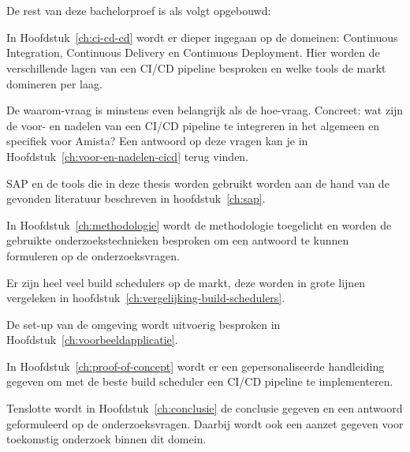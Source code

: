 \section{}
\label{sec:opzet-bachelorproef}


De rest van deze bachelorproef is als volgt opgebouwd:

In Hoofdstuk~\ref{ch:ci-cd-cd} wordt er dieper ingegaan op de domeinen: Continuous Integration, Continuous Delivery en Continuous Deployment. Hier worden de verschillende lagen van een CI/CD pipeline besproken en welke tools de markt domineren per laag.

De waarom-vraag is minstens even belangrijk als de hoe-vraag. Concreet: wat zijn de voor- en nadelen van een CI/CD pipeline te integreren in het algemeen en specifiek voor Amista? Een antwoord op deze vragen kan je in Hoofdstuk~\ref{ch:voor-en-nadelen-cicd} terug vinden.

SAP en de tools die in deze thesis worden gebruikt worden aan de hand van de gevonden literatuur beschreven in hoofdstuk~\ref{ch:sap}.

In Hoofdstuk~\ref{ch:methodologie} wordt de methodologie toegelicht en worden de gebruikte onderzoekstechnieken besproken om een antwoord te kunnen formuleren op de onderzoeksvragen.

Er zijn heel veel build schedulers op de markt, deze worden in grote lijnen vergeleken in hoofdstuk~\ref{ch:vergelijking-build-schedulers}.

De set-up van de omgeving wordt uitvoerig besproken in Hoofdstuk~\ref{ch:voorbeeldapplicatie}.

In Hoofdstuk~\ref{ch:proof-of-concept} wordt er een gepersonaliseerde handleiding gegeven om met de beste build scheduler een CI/CD pipeline te implementeren.

Tenslotte wordt in Hoofdstuk~\ref{ch:conclusie} de conclusie gegeven en een antwoord geformuleerd op de onderzoeksvragen. Daarbij wordt ook een aanzet gegeven voor toekomstig onderzoek binnen dit domein.